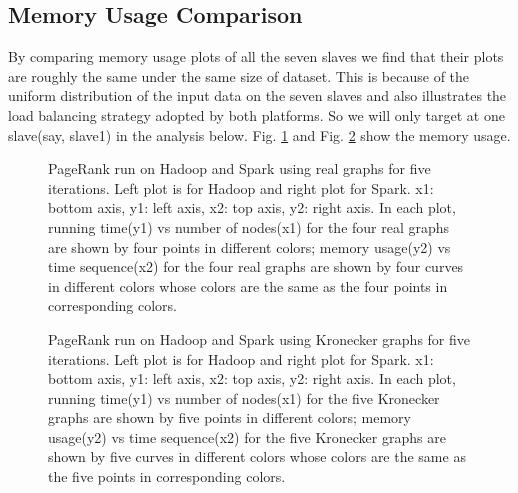 \documentclass[12pt,conference,letterpaper]{IEEEtran}
\begin{document}

\subsection{Memory Usage Comparison}

 By comparing memory usage plots of all the seven slaves we find that their plots  are roughly the same under the same size of dataset. This is because of the uniform distribution of the input data on the seven slaves and also illustrates the load balancing strategy adopted by both platforms. So we will only target at one slave(say, slave1) in the analysis below. Fig. \ref{fig:time_memory_real} and Fig. \ref{fig:time_memory_syn} show the memory usage.

 
\begin{figure}[!t]
  \centering
  \caption{PageRank run on Hadoop and Spark using real graphs for five iterations. Left plot is for Hadoop and right plot for Spark. x1: bottom axis, y1: left axis, x2: top axis, y2: right axis. In each plot, running time(y1) vs number of nodes(x1) for the four real graphs are shown by four points in different colors; memory usage(y2) vs time sequence(x2) for the four real graphs are shown by four curves in different colors whose colors are the same as the four points in corresponding colors.}
  \label{fig:time_memory_real} 
\end{figure}

\begin{figure}[!t]
  \centering
  \caption{PageRank run on Hadoop and Spark using Kronecker graphs for five iterations. Left plot is for Hadoop and right plot for Spark. x1: bottom axis, y1: left axis, x2: top axis, y2: right axis. In each plot, running time(y1) vs number of nodes(x1) for the five Kronecker graphs are shown by five points in different colors; memory usage(y2) vs time sequence(x2) for the five Kronecker graphs are shown by five curves in different colors whose colors are the same as the five points in corresponding colors.}
  \label{fig:time_memory_syn} 
\end{figure}
\end{document}
